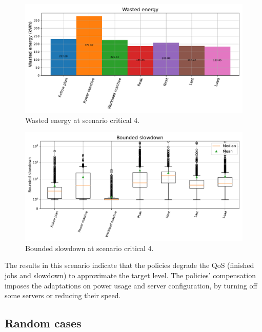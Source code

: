 \begin{figure}[!htb]
    \centering
    \includegraphics[scale=0.55]{Images/Compensations/energy_critical_4.pdf}
    \caption{Wasted energy at scenario critical 4.}
    \label{fig:energy_critical_4}
\end{figure}

\begin{figure}[!htb]
    \centering
    \includegraphics[scale=0.55]{Images/Compensations/slowdown_critical_4.pdf}
    \caption{Bounded slowdown at scenario critical 4.}
    \label{fig:slowdown_critical_4}
\end{figure}

The results in this scenario indicate that the policies degrade the QoS (finished jobs and slowdown) to approximate the target level. The policies' compensation imposes the adaptations on power usage and server configuration, by turning off some servers or reducing their speed. 


\subsection{Random cases}

